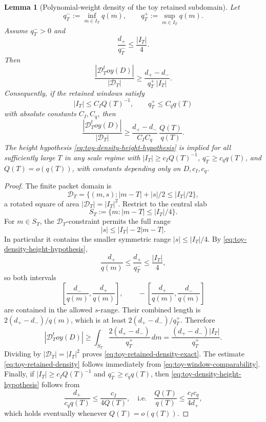 \documentclass[11pt,a4paper]{amsart}
\def\toy{toy}%
\numberwithin{equation}{section}
\theoremstyle{plain}
\newtheorem{lemma}[theorem]{Lemma}
\theoremstyle{definition}
\newcommand{\toy}{\mathrm{toy}}
\begin{document}
\begin{lemma}[Polynomial-weight density of the toy retained subdomain]
\label{lem:toy-retained-density}
Let
\[
        q_T^-:=\inf_{m\in I_T}q(m),
        \qquad
        q_T^+:=\sup_{m\in I_T}q(m).
\]
Assume \(q_T^->0\) and
\begin{equation}
\label{eq:toy-density-height-hypothesis}
        \frac{d_+}{q_T^-}\le \frac{|I_T|}{4}.
\end{equation}
Then
\begin{equation}
\label{eq:toy-retained-density-exact}
        \frac{|\mathcal D_T^\toy(D)|}{|\mathcal D_T|}
        \ge
        \frac{d_+-d_-}{q_T^+\,|I_T|}.
\end{equation}
Consequently, if the retained windows satisfy
\begin{equation}
\label{eq:toy-window-comparability}
        |I_T|\le C_I Q(T)^{-1},
        \qquad
        q_T^+\le C_q q(T)
\end{equation}
with absolute constants \(C_I,C_q\), then
\begin{equation}
\label{eq:toy-retained-density}
        \frac{|\mathcal D_T^\toy(D)|}{|\mathcal D_T|}
        \ge
        \frac{d_+-d_-}{C_I C_q}\,\frac{Q(T)}{q(T)}.
\end{equation}
The height hypothesis \eqref{eq:toy-density-height-hypothesis} is
implied for all sufficiently large \(T\) in any scale regime with
\(|I_T|\ge c_I Q(T)^{-1}\), \(q_T^-\ge c_q q(T)\), and
\(Q(T)=o(q(T))\), with constants depending only on \(D,c_I,c_q\).
\end{lemma}

\begin{proof}
The finite packet domain is
\[
    \mathcal D_T
    =\bigl\{(m,s): |m-T|+|s|/2\le |I_T|/2\bigr\},
\]
a rotated square of area \(|\mathcal D_T|=|I_T|^2\).  Restrict to the
central slab
\[
        S_T:=\{m: |m-T|\le |I_T|/4\}.
\]
For \(m\in S_T\), the \(\mathcal D_T\)-constraint permits the full range
\[
        |s|\le |I_T|-2|m-T|.
\]
In particular it contains the smaller symmetric range
\(|s|\le |I_T|/4\).  By
\eqref{eq:toy-density-height-hypothesis},
\[
        \frac{d_+}{q(m)}\le \frac{d_+}{q_T^-}\le \frac{|I_T|}{4},
\]
so both intervals
\[
        \left[\frac{d_-}{q(m)},\frac{d_+}{q(m)}\right],
        \qquad
        -\left[\frac{d_+}{q(m)},\frac{d_-}{q(m)}\right]
\]
are contained in the allowed \(s\)-range.  Their combined length is
\(2(d_+-d_-)/q(m)\), which is at least \(2(d_+-d_-)/q_T^+\).  Therefore
\[
        |\mathcal D_T^\toy(D)|
        \ge \int_{S_T}\frac{2(d_+-d_-)}{q_T^+}\,dm
        =\frac{(d_+-d_-)|I_T|}{q_T^+}.
\]
Dividing by \(|\mathcal D_T|=|I_T|^2\) proves
\eqref{eq:toy-retained-density-exact}.  The estimate
\eqref{eq:toy-retained-density} follows immediately from
\eqref{eq:toy-window-comparability}.  Finally, if
\(|I_T|\ge c_IQ(T)^{-1}\) and \(q_T^-\ge c_q q(T)\), then
\eqref{eq:toy-density-height-hypothesis} follows from
\[
        \frac{d_+}{c_q q(T)}\le \frac{c_I}{4Q(T)},
        \quad\text{i.e.}\quad
        \frac{Q(T)}{q(T)}\le \frac{c_Ic_q}{4d_+},
\]
which holds eventually whenever \(Q(T)=o(q(T))\).
\end{proof}
\end{document}
